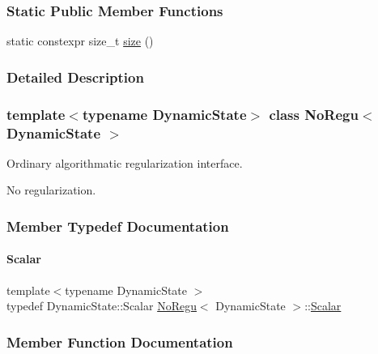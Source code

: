 \subsubsection*{Static Public Member Functions}
\begin{DoxyCompactItemize}
\item 
static constexpr size\+\_\+t \mbox{\hyperlink{class_no_regu_ade4184183a8b2c2095831f3a54e1836a}{size}} ()
\end{DoxyCompactItemize}


\subsubsection{Detailed Description}
\subsubsection*{template$<$typename Dynamic\+State$>$\newline
class No\+Regu$<$ Dynamic\+State $>$}

Ordinary algorithmatic regularization interface. 

No regularization. 

\subsubsection{Member Typedef Documentation}
\mbox{\label{class_no_regu_aa6d40425c316da9c24b55bc908d3cd14}} 
\paragraph{\texorpdfstring{Scalar}{Scalar}}
{\footnotesize\ttfamily template$<$typename Dynamic\+State $>$ \\
typedef Dynamic\+State\+::\+Scalar \mbox{\hyperlink{class_no_regu}{No\+Regu}}$<$ Dynamic\+State $>$\+::\mbox{\hyperlink{class_no_regu_aa6d40425c316da9c24b55bc908d3cd14}{Scalar}}}



\subsubsection{Member Function Documentation}
\mbox{\label{class_no_regu_a0c365c1758907b76ee8bf5138f3b20be}} 
